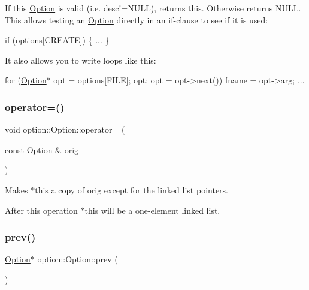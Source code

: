 If this \hyperlink{classoption_1_1Option}{Option} is valid (i.\+e. {\ttfamily desc!=N\+U\+LL}), returns this. Otherwise returns N\+U\+LL. This allows testing an \hyperlink{classoption_1_1Option}{Option} directly in an if-\/clause to see if it is used\+: 
\begin{DoxyCode}
\textcolor{keywordflow}{if} (options[CREATE])
\{
  ...
\}
\end{DoxyCode}
 It also allows you to write loops like this\+: 
\begin{DoxyCode}
\textcolor{keywordflow}{for} (\hyperlink{classoption_1_1Option_aa2810152fc23b14175b115d1a7d38095}{Option}* opt = options[FILE]; opt; opt = opt->next())
 fname = opt->arg; ... 
\end{DoxyCode}
 \mbox{\label{classoption_1_1Option_adb4b44f3778df8f28a04c48bd1b4a72b}} 
\subsubsection{\texorpdfstring{operator=()}{operator=()}}
{\footnotesize\ttfamily void option\+::\+Option\+::operator= (\begin{DoxyParamCaption}\item[{const \hyperlink{classoption_1_1Option}{Option} \&}]{orig }\end{DoxyParamCaption})\hspace{0.3cm}{\ttfamily [inline]}}



Makes {\ttfamily $\ast$this} a copy of {\ttfamily orig} except for the linked list pointers. 

After this operation {\ttfamily $\ast$this} will be a one-\/element linked list. \mbox{\label{classoption_1_1Option_a4d12001a91b0b35cf47437d0c60d2b52}} 
\subsubsection{\texorpdfstring{prev()}{prev()}}
{\footnotesize\ttfamily \hyperlink{classoption_1_1Option}{Option}$\ast$ option\+::\+Option\+::prev (\begin{DoxyParamCaption}{ }\end{DoxyParamCaption})\hspace{0.3cm}{\ttfamily [inline]}}



